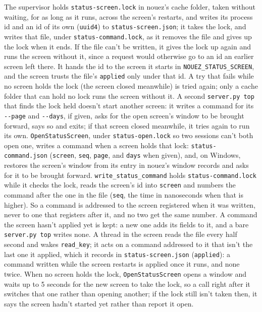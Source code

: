 \documentclass[10pt,a4paper]{article}
\newcommand{\code}[1]{\texttt{#1}}
\begin{document}
The supervisor holds \code{status-screen.lock} in nouez's cache folder, taken without waiting, for as
long as it runs, across the screen's restarts, and writes its process id and an id of its own
(\code{uuid4}) to \code{status-screen.json}; it takes the lock, and writes that file, under
\code{status-command.lock}, as it removes the file and gives up the lock when it ends. If the file
can't be written, it gives the lock up again and runs the screen without it, since a request would
otherwise go to an id an earlier screen left there. It hands the id to the screen it starts in
\code{NOUEZ\_STATUS\_SCREEN}, and the screen trusts the file's \code{applied} only under that
id. A try that
fails while no screen holds the lock (the screen closed meanwhile) is tried again; only a cache folder that can hold no
lock runs the screen without it. A second \code{server.py top} that finds the lock held doesn't start
another screen: it writes a command for its \code{-{}-page} and \code{-{}-days}, if given, asks for the
open screen's window to be brought forward, says so and exits; if that screen closed meanwhile, it
tries again to run its own. \code{OpenStatusScreen}, under \code{status-open.lock} so two
sessions can't both open one, writes a command when a screen holds that lock:
\code{status-command.json} (\code{screen}, \code{seq}, \code{page}, and \code{days} when given),
and, on Windows, restores the screen's window from its entry in nouez's window records and asks for
it to be brought forward. \code{write\_status\_command} holds \code{status-command.lock} while it
checks the lock, reads the screen's id into \code{screen} and numbers the command after the one in
the file (\code{seq}, the time in nanoseconds when that is higher). So a command is addressed to the
screen registered when it was written, never to one that registers after it, and no two get the
same number. A command the screen hasn't applied yet is kept: a new one adds its fields to it, and a
bare \code{server.py top} writes none. A thread in the screen reads the file every half second and wakes \code{read\_key}; it
acts on a command addressed to it that isn't the last one it applied, which it records in
\code{status-screen.json} (\code{applied}): a command written while the screen restarts is applied
once it runs, and none twice. When no screen holds the lock, \code{OpenStatusScreen} opens a
window and waits up to 5 seconds for the new screen to take the lock, so a call right after it
switches that one rather than opening another; if the lock still isn't taken then, it says the
screen hadn't started yet rather than report it open.
\end{document}

